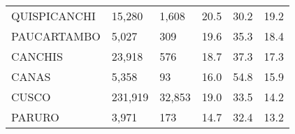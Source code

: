 \begin{tabular}{llllll}
	\cellcolor[HTML]{FF5050}QUISPICANCHI                           & 15,280                                                                & 1,608                                                            & 20.5                                                                             & 30.2                                                                        & 19.2                                                                                \\
	\cellcolor[HTML]{FF5050}PAUCARTAMBO                            & 5,027                                                                 & 309                                                              & 19.6                                                                             & 35.3                                                                        & 18.4                                                                                \\
	\cellcolor[HTML]{FF5050}CANCHIS                                & 23,918                                                                & 576                                                              & 18.7                                                                             & 37.3                                                                        & 17.3                                                                                \\
	\cellcolor[HTML]{FF5050}CANAS                                  & 5,358                                                                 & 93                                                               & 16.0                                                                             & 54.8                                                                        & 15.9                                                                                \\
	\cellcolor[HTML]{F8CBAD}CUSCO                                  & 231,919                                                               & 32,853                                                           & 19.0                                                                             & 33.5                                                                        & 14.2                                                                                \\
	\cellcolor[HTML]{F8CBAD}PARURO                                 & 3,971                                                                 & 173                                                              & 14.7                                                                             & 32.4                                                                        & 13.2                                                                                \\

\end{tabular}
